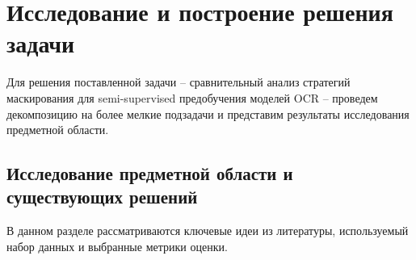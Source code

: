\section{Исследование и построение решения задачи}
\label{sec:Chapter3} 

Для решения поставленной задачи – сравнительный анализ стратегий маскирования для semi-supervised предобучения моделей OCR – проведем декомпозицию на более мелкие подзадачи и представим результаты исследования предметной области.

\subsection{Исследование предметной области и существующих решений}

В данном разделе рассматриваются ключевые идеи из литературы, используемый набор данных и выбранные метрики оценки.

